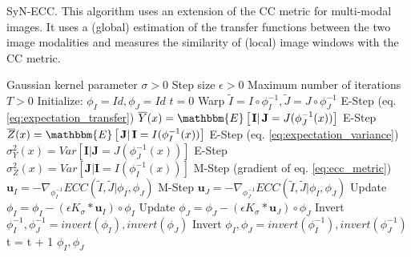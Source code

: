 \begin{algorithm}[h!]
\caption{SyN-ECC. This algorithm uses an extension of the CC metric for multi-modal images. It uses a (global) estimation of the transfer functions between the two image modalities and measures the similarity of (local) image windows with the CC metric.}\label{alg:SyNECC}
\begin{algorithmic}[1]
\REQUIRE Gaussian kernel parameter $\sigma>0$
\REQUIRE Step size $\epsilon>0$
\REQUIRE Maximum number of iterations $T>0$
\STATE Initialize: $\phi_{I} = Id, \phi_{J} = Id$
\STATE $t=0$
\REPEAT
    \STATE Warp $\tilde{I}  = I \circ \phi_{I}^{-1}, \tilde{J} = J \circ \phi_{J}^{-1}$
    \STATE E-Step (eq. \eqref{eq:expectation_transfer}) $\overline{Y}(x) = \mathbbm{E}\left[\left.\mathbf{I}\right| \mathbf{J}= J(\phi_{J}^{-1}(x))\right]$
    \STATE E-Step $\overline{Z}(x) = \mathbbm{E}\left[\left.\mathbf{J}\right| \mathbf{I}= I(\phi_{I}^{-1}(x))\right]$
    \STATE E-Step (eq. \eqref{eq:expectation_variance}) $\sigma^{2}_{Y}(x) = Var\left[\left.\mathbf{I}\right| \mathbf{J}= J(\phi_{J}^{-1}(x))\right]$
    \STATE E-Step $\sigma^{2}_{Z}(x) = Var\left[\left.\mathbf{J}\right| \mathbf{I}= I(\phi_{I}^{-1}(x))\right]$
    \STATE M-Step (gradient of eq. \eqref{eq:ecc_metric}) $\mathbf{u}_{I} = - \nabla_{\phi^{-1}_{I}} ECC(\tilde{I}, \tilde{J} | \phi_{I}, \phi_{J})$
    \STATE M-Step $\mathbf{u}_{J} = - \nabla_{\phi^{-1}_{J}} ECC(\tilde{I}, \tilde{J} | \phi_{I}, \phi_{J})$
    \STATE Update $\phi_{I} = \phi_{I} - \left(\epsilon K_{\sigma} \ast \mathbf{u}_{I} \right)\circ \phi_{I}$
    \STATE Update $\phi_{J} = \phi_{J} - \left(\epsilon K_{\sigma} \ast \mathbf{u}_{J} \right)\circ \phi_{J}$
    \STATE Invert $\phi_{I}^{-1}, \phi_{J}^{-1} = invert(\phi_{I}), invert(\phi_{J})$
    \STATE Invert $\phi_{I}, \phi_{J} = invert(\phi_{I}^{-1}), invert(\phi_{J}^{-1})$
    \STATE t = t + 1
\RETURN $\phi_{I}, \phi_{J}$
\end{algorithmic}
\end{algorithm}